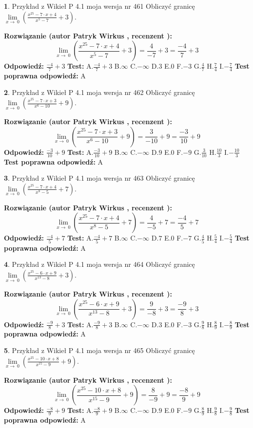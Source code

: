 \documentclass[12pt, a4paper]{article}
\theoremstyle{definition} %
\newtheorem{zad}{}
\newcommand{\zadStart}[1]{\begin{zad}#1\newline}
\newcommand{\zadStop}{\end{zad}}
\newcommand{\rozwStart}[2]{\noindent \textbf{Rozwiązanie (autor #1 , recenzent #2): }\newline}
\newcommand{\rozwStop}{\newline}
\newcommand{\odpStart}{\noindent \textbf{Odpowiedź:}\newline}
\newcommand{\odpStop}{\newline}
\newcommand{\testStart}{\noindent \textbf{Test:}\newline}
\newcommand{\testStop}{\newline}
\newcommand{\kluczStart}{\noindent \textbf{Test poprawna odpowiedź:}\newline}
\newcommand{\kluczStop}{\newline}
\begin{document}
\zadStart{Przykład z Wikieł P 4.1 moja wersja nr 461}
Obliczyć granicę $\lim\limits_{x\to\ 0}(\frac{x^{25}-7 \cdot x +4}{x^{5}-7}+3)$.
\zadStop
\rozwStart{Patryk Wirkus}{}
$$\lim\limits_{x\to\ 0}(\frac{x^{25}-7 \cdot x +4}{x^{5}-7}+3)=\frac{4}{-7}+3=\frac{-4}{7}+3$$
\rozwStop
\odpStart
$\frac{-4}{7}+3$
\odpStop
\testStart
A.$\frac{-4}{7}+3$
B.$\infty$
C.$-\infty$
D.$3$
E.$0$
F.$-3$
G.$\frac{4}{7}$
H.$\frac{7}{4}$
I.$-\frac{7}{4}$
\testStop
\kluczStart
A
\kluczStop



\zadStart{Przykład z Wikieł P 4.1 moja wersja nr 462}
Obliczyć granicę $\lim\limits_{x\to\ 0}(\frac{x^{25}-7 \cdot x +3}{x^{6}-10}+9)$.
\zadStop
\rozwStart{Patryk Wirkus}{}
$$\lim\limits_{x\to\ 0}(\frac{x^{25}-7 \cdot x +3}{x^{6}-10}+9)=\frac{3}{-10}+9=\frac{-3}{10}+9$$
\rozwStop
\odpStart
$\frac{-3}{10}+9$
\odpStop
\testStart
A.$\frac{-3}{10}+9$
B.$\infty$
C.$-\infty$
D.$9$
E.$0$
F.$-9$
G.$\frac{3}{10}$
H.$\frac{10}{3}$
I.$-\frac{10}{3}$
\testStop
\kluczStart
A
\kluczStop



\zadStart{Przykład z Wikieł P 4.1 moja wersja nr 463}
Obliczyć granicę $\lim\limits_{x\to\ 0}(\frac{x^{25}-7 \cdot x +4}{x^{8}-5}+7)$.
\zadStop
\rozwStart{Patryk Wirkus}{}
$$\lim\limits_{x\to\ 0}(\frac{x^{25}-7 \cdot x +4}{x^{8}-5}+7)=\frac{4}{-5}+7=\frac{-4}{5}+7$$
\rozwStop
\odpStart
$\frac{-4}{5}+7$
\odpStop
\testStart
A.$\frac{-4}{5}+7$
B.$\infty$
C.$-\infty$
D.$7$
E.$0$
F.$-7$
G.$\frac{4}{5}$
H.$\frac{5}{4}$
I.$-\frac{5}{4}$
\testStop
\kluczStart
A
\kluczStop



\zadStart{Przykład z Wikieł P 4.1 moja wersja nr 464}
Obliczyć granicę $\lim\limits_{x\to\ 0}(\frac{x^{25}-6 \cdot x +9}{x^{13}-8}+3)$.
\zadStop
\rozwStart{Patryk Wirkus}{}
$$\lim\limits_{x\to\ 0}(\frac{x^{25}-6 \cdot x +9}{x^{13}-8}+3)=\frac{9}{-8}+3=\frac{-9}{8}+3$$
\rozwStop
\odpStart
$\frac{-9}{8}+3$
\odpStop
\testStart
A.$\frac{-9}{8}+3$
B.$\infty$
C.$-\infty$
D.$3$
E.$0$
F.$-3$
G.$\frac{9}{8}$
H.$\frac{8}{9}$
I.$-\frac{8}{9}$
\testStop
\kluczStart
A
\kluczStop



\zadStart{Przykład z Wikieł P 4.1 moja wersja nr 465}
Obliczyć granicę $\lim\limits_{x\to\ 0}(\frac{x^{25}-10 \cdot x +8}{x^{15}-9}+9)$.
\zadStop
\rozwStart{Patryk Wirkus}{}
$$\lim\limits_{x\to\ 0}(\frac{x^{25}-10 \cdot x +8}{x^{15}-9}+9)=\frac{8}{-9}+9=\frac{-8}{9}+9$$
\rozwStop
\odpStart
$\frac{-8}{9}+9$
\odpStop
\testStart
A.$\frac{-8}{9}+9$
B.$\infty$
C.$-\infty$
D.$9$
E.$0$
F.$-9$
G.$\frac{8}{9}$
H.$\frac{9}{8}$
I.$-\frac{9}{8}$
\testStop
\kluczStart
A
\kluczStop
\end{document}
